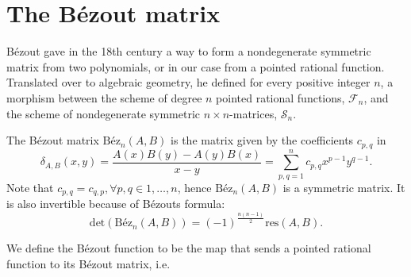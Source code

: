 \section{The Bézout matrix}
%
Bézout gave in the 18th century a way to form a nondegenerate symmetric matrix from two polynomials, or in our case from a pointed rational function. Translated over to algebraic geometry, he defined for every positive integer \(n\), a morphism between the scheme of degree \(n\) pointed rational functions, \(\mathcal{F}_n\), and the scheme of nondegenerate symmetric \(n\times n\)-matrices, \(\mathcal{S}_n\). 
%
\begin{definition}\label{def:Bezout matrix}
%
The Bézout matrix \(\text{Béz}_n(A,B)\) is the matrix given by the coefficients \(c_{p,q}\) in 
%
\begin{equation*}
%
    \delta_{A,B}(x,y) = \frac{A(x)B(y)-A(y)B(x)}{x-y} = \displaystyle \sum_{p,q=1}^n c_{p,q}x^{p-1}y^{q-1}.
%
\end{equation*}
%
Note that \(c_{p,q}=c_{q,p}, \forall p,q \in {1,\dots,n}\), hence \(\text{Béz}_n(A,B)\) is a symmetric matrix. 
%
It is also invertible because of Bézouts formula:
\begin{equation*}
%
    \text{det}(\text{Béz}_n(A,B))=(-1)^{\frac{n(n-1)}{2}}\text{res}(A,B).
\end{equation*}
%
\end{definition}
%


\begin{definition}
We define the Bézout function to be the map that sends a pointed rational function to its Bézout matrix, i.e. 

\begin{center}
%

%
\end{center}
\end{definition}
%


